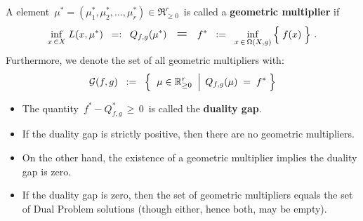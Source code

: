 \vskip 1.0cm
\begin{definition}
\mbox{}
\vskip 0.1cm
\noindent
A element
\,$\mu^{*} = (\mu_{1}^{*},\mu_{2}^{*},\ldots,\mu_{r}^{*}) \in \Re_{\geq 0}^{r}$\,
is called a \textbf{geometric multiplier} if
\begin{equation*}
	\underset{x\,\in X}{\inf}\;L(x,\mu^{*})
\;\; =: \;\;
	Q_{f,g}(\mu^{*})
\quad\textnormal{\Large$=$}\quad
	f^{*}
\;\; := \;\;
	\underset{x\,\in\,\Omega(X,g)}{\inf}\left\{\;
		\overset{{\color{white}.}}{f(x)}
		\;\right\}\,.
\end{equation*}
Furthermore, we denote the set of all geometric multipliers with:
\begin{equation*}
\mathcal{G}(f,g)
\;\; := \;\;
	\left\{\;\,
		\left.
		\overset{{\color{white}1}}{\mu} \in \Re_{\geq 0}^{r}
		\;\;\right\vert\;
			Q_{f,g}(\mu) \; = \; f^{*}
		\;\right\}
\end{equation*}
\end{definition}

\vskip 1.0cm
\begin{remark}
\mbox{}
\vskip 0.0cm
\begin{itemize}
\item
	The quantity \,$f^{*} - Q_{f,g}^{*}\,\geq\,0$\, is called the \textbf{duality gap}.
\item
	If the duality gap is strictly positive, then there are no geometric multipliers.
\item
	On the other hand, the existence of a geometric multiplier implies the duality gap is zero.
\item
	If the duality gap is zero, then the set of geometric multipliers equals the set of Dual Problem solutions
	(though either, hence both, may be empty).
\end{itemize}
\end{remark}


